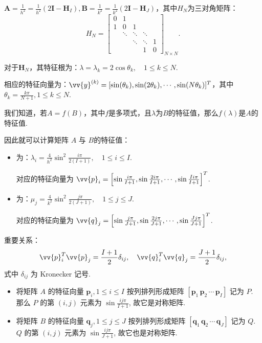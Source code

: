 $\bm{A}=\frac{1}{h^2}=\frac{1}{h^2}(2\bm{I}-\bm{H}_I),\bm{B}=\frac{1}{k^2}=\frac{1}{k^2}(2\bm{I}-\bm{H}_J)$，其中$H_N$为三对角矩阵：
\[ H_N = \begin{bmatrix}
0 & 1 & & \\
1 & 0 & 1 & \\
& \ddots & \ddots & \ddots \\
& & \ddots & \ddots & 1 \\
& & & 1 & 0
\end{bmatrix}_{N \times N}. \]\par
对于$\bm{H}_N$，其特征根为：$\lambda = \lambda_k = 2 \cos \theta_k, \quad 1 \leq k \leq N$.\par
相应的特征向量为：$\vv{y}^{(k)} = [\sin(\theta_k), \sin(2\theta_k), \cdots, \sin(N\theta_k)]^T$，其中$\theta_k = \frac{k\pi}{N+1}, 1 \leq k \leq N$.\par
我们知道，若$A=f(B)$，其中$f$是多项式，且$\lambda$为$B$的特征值，那么$f(\lambda)$是$A$的特征值.\par
因此就可以计算矩阵 $A$ 与 $B$的特征值：
\begin{itemize}
    \item {}为：$\lambda_i = \frac{4}{h^2} \sin^2 \frac{i\pi}{2(I+1)}, \quad 1 \leq i \leq I$.\par
    对应的特征向量为 $\vv{p}_i = \left[\sin \frac{i\pi}{I+1}, \sin \frac{2i\pi}{I+1}, \cdots, \sin \frac{Ii\pi}{I+1}\right]^T$.
    \item {}为：$\mu_j = \frac{4}{k^2} \sin^2 \frac{j\pi}{2(J+1)}, \quad 1 \leq j \leq J$.\par
    对应的特征向量为 $\vv{q}_j = \left[\sin \frac{j\pi}{J+1}, \sin \frac{2j\pi}{J+1}, \cdots, \sin \frac{Jj\pi}{J+1}\right]^T$.
\end{itemize}

\begin{important}
    重要关系：
    \[ \vv{p}_i^T \vv{p}_j = \frac{I+1}{2} \delta_{ij}, \quad \vv{q}_i^T \vv{q}_j = \frac{J+1}{2} \delta_{ij}, \]
    式中 $\delta_{ij}$ 为 Kronecker 记号.
\end{important}



\begin{itemize}
    \item 将矩阵 $A$ 的特征向量 $\bm{p}_i, 1 \leq i \leq I$ 按列排列形成矩阵 $[\bm{p}_1 \, \bm{p}_2 \, \cdots \, \bm{p}_I]$ 记为 $P$. 那么 $P$ 的第 $(i, j)$ 元素为 $\sin \frac{ij\pi}{I+1}$, 故它是对称矩阵.
    \item 将矩阵 $B$ 的特征向量 $\bm{q}_j, 1 \leq j \leq J$ 按列排列形成矩阵 $[\bm{q}_1 \, \bm{q}_2 \, \cdots \, \bm{q}_J]$ 记为 $Q$. $Q$ 的第 $(i, j)$ 元素为 $\sin \frac{ij\pi}{J+1}$, 故它也是对称矩阵.
\end{itemize}


